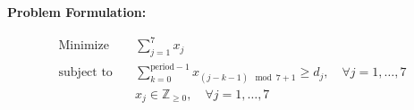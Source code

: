 \documentclass{article}
\begin{document}
\textbf{Problem Formulation:}

\begin{align*}
    \text{Minimize} \quad & \sum_{j=1}^{7} x_j \\
    \text{subject to} \quad & \sum_{k=0}^{\text{period}-1} x_{(j-k-1) \mod 7 + 1} \geq d_j, \quad \forall j = 1, \ldots, 7 \\
    & x_j \in \mathbb{Z}_{\geq 0}, \quad \forall j = 1, \ldots, 7
\end{align*}
\end{document}
